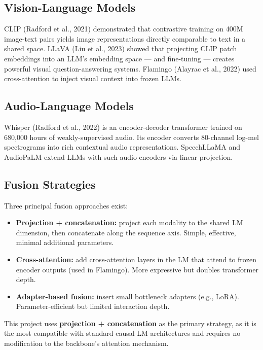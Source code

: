 \documentclass[11pt]{article}
\begin{document}
\subsection{Vision-Language Models}


CLIP (Radford et al., 2021) demonstrated that contrastive training on 400M image-text pairs yields image representations directly comparable to text in a shared space. LLaVA (Liu et al., 2023) showed that projecting CLIP patch embeddings into an LLM's embedding space — and fine-tuning — creates powerful visual question-answering systems. Flamingo (Alayrac et al., 2022) used cross-attention to inject visual context into frozen LLMs.


\subsection{Audio-Language Models}


Whisper (Radford et al., 2022) is an encoder-decoder transformer trained on 680,000 hours of weakly-supervised audio. Its encoder converts 80-channel log-mel spectrograms into rich contextual audio representations. SpeechLLaMA and AudioPaLM extend LLMs with such audio encoders via linear projection.


\subsection{Fusion Strategies}


Three principal fusion approaches exist:

\begin{itemize}[leftmargin=*]
\item \textbf{Projection + concatenation:} project each modality to the shared LM dimension, then concatenate along the sequence axis. Simple, effective, minimal additional parameters.
\item \textbf{Cross-attention:} add cross-attention layers in the LM that attend to frozen encoder outputs (used in Flamingo). More expressive but doubles transformer depth.
\item \textbf{Adapter-based fusion:} insert small bottleneck adapters (e.g., LoRA). Parameter-efficient but limited interaction depth.

\end{itemize}
This project uses \textbf{projection + concatenation} as the primary strategy, as it is the most compatible with standard causal LM architectures and requires no modification to the backbone's attention mechanism.
\end{document}
